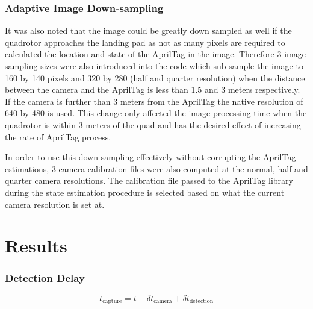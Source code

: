 \documentclass[11pt, twocolumn]{article}
\begin{document}
\subsubsection{Adaptive Image Down-sampling}
It was also noted that the image could be greatly down sampled as well if the quadrotor approaches the landing pad as not as many pixels are required to calculated the location and state of the AprilTag in the image. Therefore 3 image sampling sizes were also introduced into the code which sub-sample the image to 160 by 140 pixels and 320 by 280 (half and quarter resolution) when the distance between the camera and the AprilTag is less than 1.5 and 3 meters respectively. If the camera is further than 3 meters from the AprilTag the native resolution of 640 by 480 is used. This change only affected the image processing time when the quadrotor is within 3 meters of the quad and has the desired effect of increasing the rate of AprilTag process.

In order to use this down sampling effectively without corrupting the AprilTag estimations, 3 camera calibration files were also computed at the normal, half and quarter camera resolutions. The calibration file passed to the AprilTag library during the state estimation procedure is selected based on what the current camera resolution is set at. 

\section{Results}


\subsubsection{Detection Delay}
\begin{equation}
    t_{\text{capture}} = t - \delta t_{\text{camera}} + \delta t_{\text{detection}}
\end{equation}


{}

\end{document}
